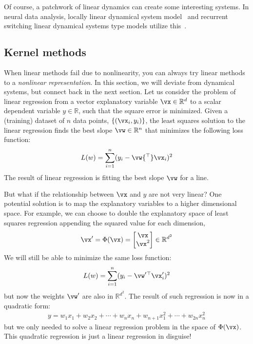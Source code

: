 \documentclass[a4paper,11pt]{exam}
\newcounter{ct}
\newcommand{\trp}{{^\top}} %
\newcommand{\field}[1]{\ensuremath{\mathbb{#1}}}
\newcommand{\reals}{\field{R}}
\begin{document}
\begin{questions}
Of course, a patchwork of linear dynamics can create some interesting systems.
In neural data analysis, locally linear dynamical system model~\cite{Zhao2016d} and recurrent switching linear dynamical systems type models utilize this~\citep{Linderman2017,Nassar2018b}.

\subsection{Kernel methods}
When linear methods fail due to nonlinearity, you can always try linear methods to a \emph{nonlinear representation}.
In this section, we will deviate from dynamical systems, but connect back in the next section.
Let us consider the problem of linear regression from a vector explanatory variable $\vx \in \reals^d$ to a scalar dependent variable $y \in \reals$, such that the square error is minimized.
Given a (training) dataset of $n$ data points, $\{ (\vx_i, y_i) \}$, the least squares solution to the linear regression finds the best slope $\vw \in \reals^n$ that minimizes the following loss function:
\begin{align}\label{eq:leastsquares:linear}
    L(w) = \sum_{i=1}^n (y_i - \vw\trp \vx_i)^2
\end{align}
The result of linear regression is fitting the best slope $\vw$ for a line.

But what if the relationship between $\vx$ and $y$ are not very linear?
One potential solution is to map the explanatory variables to a higher dimensional space.
For example, we can choose to double the explanatory space of least squares regression appending the squared value for each dimension,
\begin{align}
\vx' = \Phi(\vx) =
\begin{bmatrix}
\vx
\\
\vx^2
\end{bmatrix}
\in \reals^{d^2}
\end{align}
We will still be able to minimize the same loss function:
\begin{align}\label{eq:leastsquares:quadratic}
    L(w) = \sum_{i=1}^n (y_i - \vw'\trp \vx'_i)^2
\end{align}
but now the weights $\vw'$ are also in $\reals^{d^2}$.
The result of such regression is now in a quadratic form:
\begin{align}
	y = w_1 x_1 + w_2 x_2 + \cdots + w_n x_n + w_{n+1} x_1^2 + \cdots + w_{2n} x_n^2
\end{align}
but we only needed to solve a linear regression problem in the space of $\Phi(\vx)$.
This quadratic regression is just a linear regression in disguise!


\end{questions}
\end{document}
